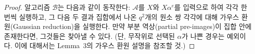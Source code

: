 \begin{proof}
    알고리즘 $\mathcal{B}$는 다음과 같이 동작한다: $\mathcal{A}$를 $X$와
    $X\alpha^e$를 입력으로 하여 각각 한 번씩 실행하고, 그 다음 두 결과 집합에서
    나온 $q^2$개의 원소 쌍 각각에 대해 가우스 환원(Gaussian reduction)을
    실행한다. 만약 부분 역상(partial pre-images)이 집합 안에 존재한다면,
    그것들은 찾아낼 수 있다. (단, 무작위로 선택된 $\alpha$가 나쁜 경우는
    예외이다. 이에 대해서는 Lemma~3의 가우스 환원 설명을 참조할 것.)
\end{proof}

    
